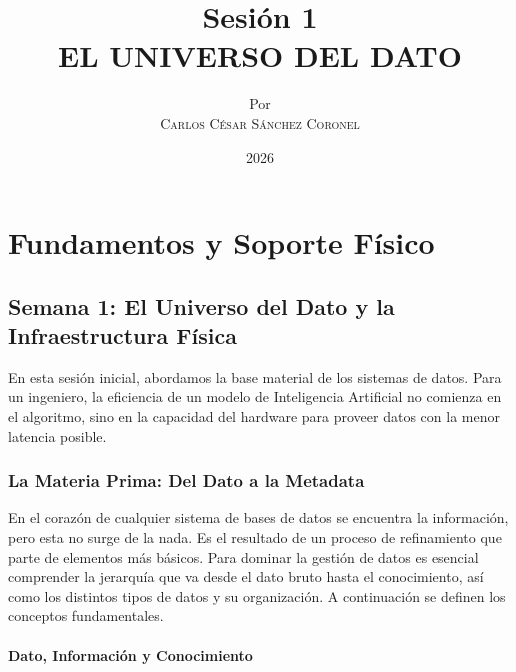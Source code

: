 \documentclass[12pt,a4paper,openany,oneside]{book}
\title{
    \textbf{Sesión 1} \\ 
    \Huge \textbf{EL UNIVERSO DEL DATO} \\
    
}
\author{
    \small Por \\ \vspace{0.2cm}
    \Large \textsc{Carlos César Sánchez Coronel}
}
\date{2026}
\begin{document}
\maketitle

\chapter{Fundamentos y Soporte Físico}

\section{Semana 1: El Universo del Dato y la Infraestructura Física}

En esta sesión inicial, abordamos la base material de los sistemas de datos. Para un ingeniero, la eficiencia de un modelo de Inteligencia Artificial no comienza en el algoritmo, sino en la capacidad del hardware para proveer datos con la menor latencia posible.

\subsection{La Materia Prima: Del Dato a la Metadata}

En el corazón de cualquier sistema de bases de datos se encuentra la información, pero esta no surge de la nada. Es el resultado de un proceso de refinamiento que parte de elementos más básicos. Para dominar la gestión de datos es esencial comprender la jerarquía que va desde el dato bruto hasta el conocimiento, así como los distintos tipos de datos y su organización. A continuación se definen los conceptos fundamentales.

\subsubsection{Dato, Información y Conocimiento}
\end{document}
